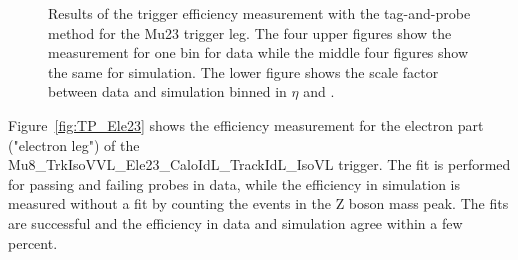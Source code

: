 \begin{figure}[htbp!]
\begin{center}
      \caption{Results of the trigger efficiency measurement with the tag-and-probe method for the Mu23 trigger leg. The four upper figures show the measurement for one bin for data  while the middle four figures show the same for simulation. The lower figure shows 
       the scale factor between data and simulation binned in $\eta$ and \pt. }  
    \label{fig:TP_Mu23}
  \end{center}
\end{figure}


Figure~\ref{fig:TP_Ele23} shows the efficiency measurement for the electron part ("electron leg") of the\\ Mu8\_TrkIsoVVL\_Ele23\_CaloIdL\_TrackIdL\_IsoVL trigger.
The fit is performed for passing and failing probes in data, while the efficiency in simulation is measured without a fit by counting the events in the Z boson mass peak.
The fits are successful and the efficiency in data and simulation agree within a few percent.

